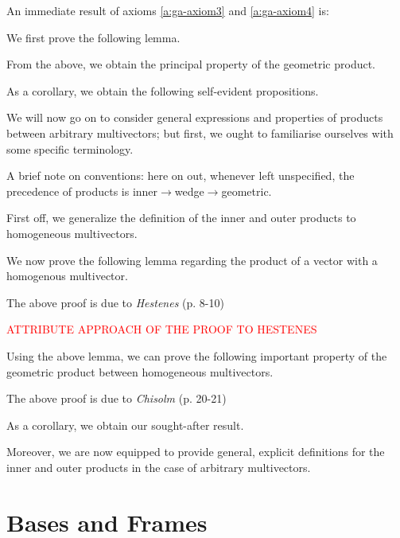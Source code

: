 An immediate result of axioms \ref{a:ga-axiom3} and \ref{a:ga-axiom4} is:


We first prove the following lemma.



From the above, we obtain the principal property of the geometric product.



As a corollary, we obtain the following self-evident propositions.



We will now go on to consider general expressions and properties of products between arbitrary multivectors; but first, we ought to familiarise ourselves with some specific terminology.

A brief note on conventions: here on out, whenever left unspecified, the precedence of products is inner$\to$wedge$\to$geometric.

First off, we generalize the definition of the inner and outer products to homogeneous multivectors.



We now prove the following lemma regarding the product of a vector with a homogenous multivector.



The above proof is due to \textit{Hestenes} (p. 8-10)\cite{ga-origin}

\textcolor{red}{ATTRIBUTE APPROACH OF THE PROOF TO HESTENES}

Using the above lemma, we can prove the following important property of the geometric product between homogeneous multivectors.



The above proof is due to \textit{Chisolm} (p. 20-21)\cite{ga-chisolm}

As a corollary, we obtain our sought-after result.



Moreover, we are now equipped to provide general, explicit definitions for the inner and outer products in the case of arbitrary multivectors.



\newpage

\section{Bases and Frames}

